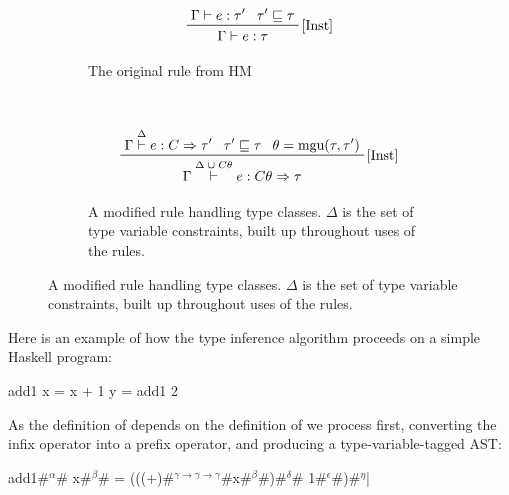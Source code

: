 \documentclass[dissertation.tex]{subfiles}
\begin{document}
{{{            \begin{figure}[h]
            \centering
            \begin{subfigure}[t]{0.3\textwidth}
            \begin{displaymath}
            \prftree[r]{\([\text{Inst}]\)}
            {\prfassumption{\Gamma\vdash e : \tau'}}
            {\prfassumption{\tau' \sqsubseteq \tau}}
            {\Gamma\vdash e : \tau}
            \end{displaymath}
            \caption*{The original rule from HM}
            \end{subfigure}
            ~
            \begin{subfigure}[t]{0.6\textwidth}
            \begin{displaymath}
            \prftree[r]{\([\text{Inst}]\)}
            {\prfassumption{\Gamma\stackrel{\Delta}{\vdash} e : C\Rightarrow\tau'}}
            {\prfassumption{\tau' \sqsubseteq \tau}}
            {\prfassumption{\theta = \text{mgu}(\tau, \tau')}}
            {\Gamma\stackrel{\Delta\;\cup\;C\theta}{\vdash} e : C\theta\Rightarrow\tau}
            \end{displaymath}
            \caption*{A modified rule handling type classes. \(\Delta\) is the set of type variable constraints, built up throughout uses of the rules.}
            \end{subfigure}
            \end{figure}


            Here is an example of how the type inference algorithm proceeds on a simple Haskell program:

            \begin{haskellfigure}
            add1 x = x + 1
            y = add1 2
            \end{haskellfigure}

            As the definition of  depends on the definition of  we process 
            first, converting the infix operator into a prefix operator, and producing a type-variable-tagged AST:

            \begin{haskellfigure}
            add1#\(^\alpha\)# x#\(^\beta\)# = (((+)#\(^{\gamma \rightarrow \gamma \rightarrow \gamma}\)#x#\(^\beta\)#)#\(^\delta\)# 1#\(^\epsilon\)#)#\(^\eta\)|
            \end{haskellfigure}

}}}
\end{document}
